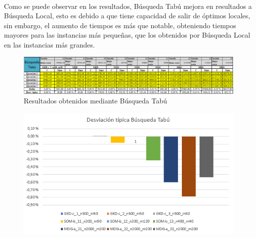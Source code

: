 \documentclass{article}
\begin{document}
			\paragraph{}Como se puede observar en los resultados, Búsqueda Tabú mejora en resultados a Búsqueda Local, esto es debido a que tiene capacidad de salir de óptimos locales, sin embargo, el aumento de tiempos es más que notable, obteniendo tiempos mayores para las instancias más pequeñas, que los obtenidos por Búsqueda Local en las instancias más grandes.
			
			\begin{figure}[H]
				
				\centering
				\includegraphics[scale=0.4]{img/btabuResult}
				\caption{Resultados obtenidos mediante Búsqueda Tabú}
				
			\end{figure}
		
			\begin{figure}[H]
				
				\centering
				\includegraphics[scale=0.4]{img/DTBtabu}
				
			\end{figure}
		
\end{document}

